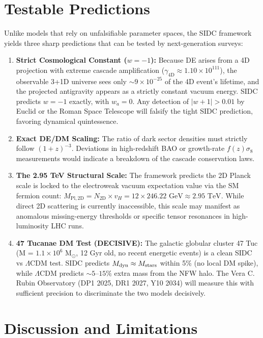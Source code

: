 \documentclass[12pt, a4paper]{article}
\newcommand{\mpld}[1]{M_{\text{Pl},#1\text{D}}}
\begin{document}
\section{Testable Predictions}
\label{sec:predictions}

Unlike models that rely on unfalsifiable parameter spaces, the SIDC framework yields three sharp predictions that can be tested by next-generation surveys:

\begin{enumerate}
    \item \textbf{Strict Cosmological Constant ($w = -1$):} Because DE arises from a 4D projection with extreme cascade amplification ($\gamma_{4\text{D}} \approx 1.10 \times 10^{111}$), the observable 3+1D universe sees only $\sim 9 \times 10^{-25}$ of the 4D event's lifetime, and the projected antigravity appears as a strictly constant vacuum energy. SIDC predicts $w = -1$ exactly, with $w_a = 0$. Any detection of $|w+1| > 0.01$ by Euclid or the Roman Space Telescope will falsify the tight SIDC prediction, favoring dynamical quintessence.
    \item \textbf{Exact DE/DM Scaling:} The ratio of dark sector densities must strictly follow $(1+z)^{-3}$. Deviations in high-redshift BAO or growth-rate $f(z)\sigma_8$ measurements would indicate a breakdown of the cascade conservation laws.
    \item \textbf{The 2.95 TeV Structural Scale:} The framework predicts the 2D Planck scale is locked to the electroweak vacuum expectation value via the SM fermion count: $\mpld{2} = N_{2\text{D}} \times v_H = 12 \times 246.22 \text{ GeV} \approx 2.95 \text{ TeV}$. While direct 2D scattering is currently inaccessible, this scale may manifest as anomalous missing-energy thresholds or specific tensor resonances in high-luminosity LHC runs.
    \item \textbf{47 Tucanae DM Test (DECISIVE):} The galactic globular cluster 47 Tuc (M = $1.1 \times 10^6$ M$_\odot$, 12 Gyr old, no recent energetic events) is a clean SIDC vs $\Lambda$CDM test. SIDC predicts $M_{\rm dyn} \approx M_{\rm stars}$ within 5\% (no local DM spike), while $\Lambda$CDM predicts $\sim 5\text{--}15\%$ extra mass from the NFW halo. The Vera C. Rubin Observatory (DP1 2025, DR1 2027, Y10 2034) will measure this with sufficient precision to discriminate the two models decisively.
\end{enumerate}

\section{Discussion and Limitations}
\label{sec:discussion}
\end{document}
